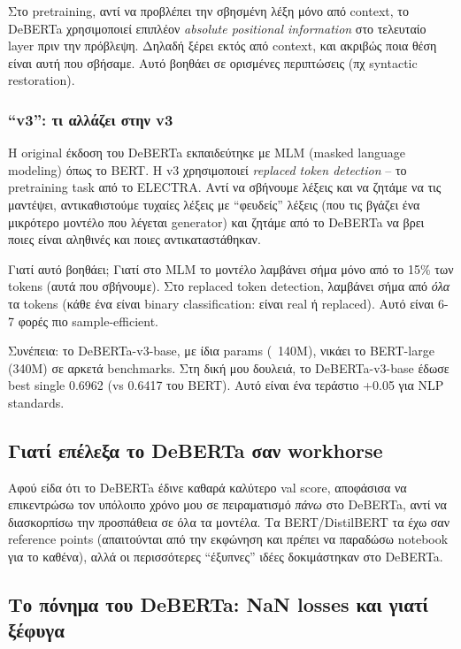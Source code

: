\documentclass[12pt]{fphw}
\begin{document}
Στο pretraining, αντί να προβλέπει την σβησμένη λέξη μόνο από context, το DeBERTa χρησιμοποιεί επιπλέον \emph{absolute positional information} στο τελευταίο layer πριν την πρόβλεψη. Δηλαδή ξέρει εκτός από context, και ακριβώς ποια θέση είναι αυτή που σβήσαμε. Αυτό βοηθάει σε ορισμένες περιπτώσεις (πχ syntactic restoration).

\subsubsection{``v3'': τι αλλάζει στην v3}

Η original έκδοση του DeBERTa εκπαιδεύτηκε με MLM (masked language modeling) όπως το BERT. Η v3 χρησιμοποιεί \emph{replaced token detection} -- το pretraining task από το ELECTRA. Αντί να σβήνουμε λέξεις και να ζητάμε να τις μαντέψει, αντικαθιστούμε τυχαίες λέξεις με ``φευδείς'' λέξεις (που τις βγάζει ένα μικρότερο μοντέλο που λέγεται generator) και ζητάμε από το DeBERTa να βρει ποιες είναι αληθινές και ποιες αντικαταστάθηκαν.

Γιατί αυτό βοηθάει; Γιατί στο MLM το μοντέλο λαμβάνει σήμα μόνο από το 15\% των tokens (αυτά που σβήνουμε). Στο replaced token detection, λαμβάνει σήμα από \emph{όλα} τα tokens (κάθε ένα είναι binary classification: είναι real ή replaced). Αυτό είναι 6-7 φορές πιο sample-efficient.

Συνέπεια: το DeBERTa-v3-base, με ίδια params (~140M), νικάει το BERT-large (340M) σε αρκετά benchmarks. Στη δική μου δουλειά, το DeBERTa-v3-base έδωσε best single 0.6962 (vs 0.6417 του BERT). Αυτό είναι ένα τεράστιο +0.05 για NLP standards.

\subsection{Γιατί επέλεξα το DeBERTa σαν workhorse}

Αφού είδα ότι το DeBERTa έδινε καθαρά καλύτερο val score, αποφάσισα να επικεντρώσω τον υπόλοιπο χρόνο μου σε πειραματισμό \emph{πάνω} στο DeBERTa, αντί να διασκορπίσω την προσπάθεια σε όλα τα μοντέλα. Τα BERT/DistilBERT τα έχω σαν reference points (απαιτούνται από την εκφώνηση και πρέπει να παραδώσω notebook για το καθένα), αλλά οι περισσότερες ``έξυπνες'' ιδέες δοκιμάστηκαν στο DeBERTa.

\subsection{Το πόνημα του DeBERTa: NaN losses και γιατί ξέφυγα}
\end{document}
